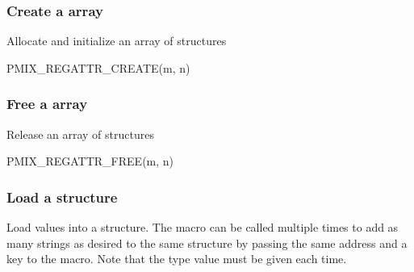 \begin{arglist}
\end{arglist}

\subsubsection{Create a  array}

Allocate and initialize an array of  structures

\cspecificstart
\begin{codepar}
PMIX_REGATTR_CREATE(m, n)
\end{codepar}
\cspecificend

\begin{arglist}
\end{arglist}

\subsubsection{Free a  array}

Release an array of  structures

\cspecificstart
\begin{codepar}
PMIX_REGATTR_FREE(m, n)
\end{codepar}
\cspecificend

\begin{arglist}
\end{arglist}

\subsubsection{Load a structure}

Load values into a  structure. The macro can be called multiple times to add as many strings as desired to the same structure by passing the same address and a  key to the macro. Note that the  type value must be given each time.

